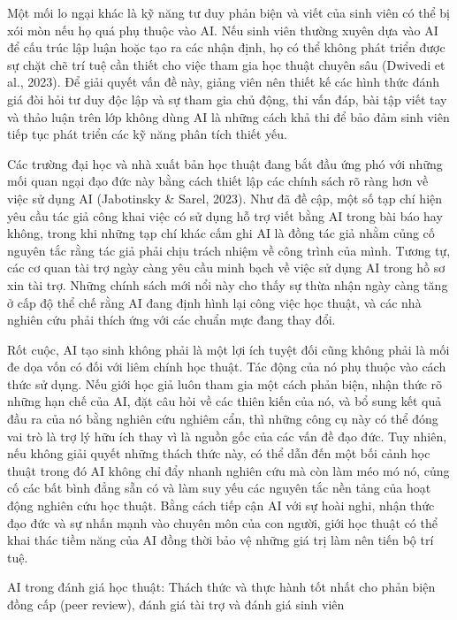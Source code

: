 Một mối lo ngại khác là kỹ năng tư duy phản biện và viết của sinh viên có thể bị xói mòn nếu họ quá phụ thuộc vào AI. Nếu sinh viên thường xuyên dựa vào AI để cấu trúc lập luận hoặc tạo ra các nhận định, họ có thể không phát triển được sự chặt chẽ trí tuệ cần thiết cho việc tham gia học thuật chuyên sâu (Dwivedi et al., 2023). Để giải quyết vấn đề này, giảng viên nên thiết kế các hình thức đánh giá đòi hỏi tư duy độc lập và sự tham gia chủ động, thi vấn đáp, bài tập viết tay và thảo luận trên lớp không dùng AI là những cách khả thi để bảo đảm sinh viên tiếp tục phát triển các kỹ năng phân tích thiết yếu.

Các trường đại học và nhà xuất bản học thuật đang bắt đầu ứng phó với những mối quan ngại đạo đức này bằng cách thiết lập các chính sách rõ ràng hơn về việc sử dụng AI (Jabotinsky \& Sarel, 2023). Như đã đề cập, một số tạp chí hiện yêu cầu tác giả công khai việc có sử dụng hỗ trợ viết bằng AI trong bài báo hay không, trong khi những tạp chí khác cấm ghi AI là đồng tác giả nhằm củng cố nguyên tắc rằng tác giả phải chịu trách nhiệm về công trình của mình. Tương tự, các cơ quan tài trợ ngày càng yêu cầu minh bạch về việc sử dụng AI trong hồ sơ xin tài trợ. Những chính sách mới nổi này cho thấy sự thừa nhận ngày càng tăng ở cấp độ thể chế rằng AI đang định hình lại công việc học thuật, và các nhà nghiên cứu phải thích ứng với các chuẩn mực đang thay đổi.

Rốt cuộc, AI tạo sinh không phải là một lợi ích tuyệt đối cũng không phải là mối đe dọa vốn có đối với liêm chính học thuật. Tác động của nó phụ thuộc vào cách thức sử dụng. Nếu giới học giả luôn tham gia một cách phản biện, nhận thức rõ những hạn chế của AI, đặt câu hỏi về các thiên kiến của nó, và bổ sung kết quả đầu ra của nó bằng nghiên cứu nghiêm cẩn, thì những công cụ này có thể đóng vai trò là trợ lý hữu ích thay vì là nguồn gốc của các vấn đề đạo đức. Tuy nhiên, nếu không giải quyết những thách thức này, có thể dẫn đến một bối cảnh học thuật trong đó AI không chỉ đẩy nhanh nghiên cứu mà còn làm méo mó nó, củng cố các bất bình đẳng sẵn có và làm suy yếu các nguyên tắc nền tảng của hoạt động nghiên cứu học thuật. Bằng cách tiếp cận AI với sự hoài nghi, nhận thức đạo đức và sự nhấn mạnh vào chuyên môn của con người, giới học thuật có thể khai thác tiềm năng của AI đồng thời bảo vệ những giá trị làm nên tiến bộ trí tuệ.

AI trong đánh giá học thuật: Thách thức và thực hành tốt nhất cho phản biện đồng cấp (peer review), đánh giá tài trợ và đánh giá sinh viên

